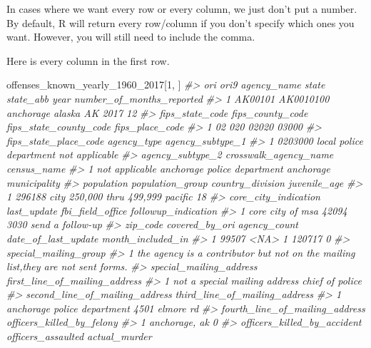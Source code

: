 \documentclass[
  12pt,
]{book}
\newenvironment{Shaded}{\begin{snugshade}}{\end{snugshade}}
\newcommand{\CommentTok}[1]{\textcolor[rgb]{0.37,0.37,0.37}{\textit{#1}}}
\newcommand{\DecValTok}[1]{\textcolor[rgb]{0.06,0.06,0.06}{#1}}
\newcommand{\NormalTok}[1]{#1}
\begin{document}
In cases where we want every row or every column, we just don't put a number. By default, R will return every row/column if you don't specify which ones you want. However, you will still need to include the comma.

Here is every column in the first row.

\begin{Shaded}
\begin{Highlighting}[]
\NormalTok{offenses\_known\_yearly\_}\DecValTok{1960}\NormalTok{\_}\DecValTok{2017}\NormalTok{[}\DecValTok{1}\NormalTok{, ]}
\CommentTok{\#>       ori      ori9 agency\_name  state state\_abb year number\_of\_months\_reported}
\CommentTok{\#> 1 AK00101 AK0010100   anchorage alaska        AK 2017                        12}
\CommentTok{\#>   fips\_state\_code fips\_county\_code fips\_state\_county\_code fips\_place\_code}
\CommentTok{\#> 1              02              020                  02020           03000}
\CommentTok{\#>   fips\_state\_place\_code             agency\_type agency\_subtype\_1}
\CommentTok{\#> 1               0203000 local police department   not applicable}
\CommentTok{\#>   agency\_subtype\_2       crosswalk\_agency\_name            census\_name}
\CommentTok{\#> 1   not applicable anchorage police department anchorage municipality}
\CommentTok{\#>   population          population\_group country\_division juvenile\_age}
\CommentTok{\#> 1     296188 city 250,000 thru 499,999          pacific           18}
\CommentTok{\#>   core\_city\_indication last\_update fbi\_field\_office followup\_indication}
\CommentTok{\#> 1     core city of msa       42094             3030    send a follow{-}up}
\CommentTok{\#>   zip\_code covered\_by\_ori agency\_count date\_of\_last\_update month\_included\_in}
\CommentTok{\#> 1    99507           <NA>            1              120717                 0}
\CommentTok{\#>                                                              special\_mailing\_group}
\CommentTok{\#> 1 the agency is a contributor but not on the mailing list,they are not sent forms.}
\CommentTok{\#>         special\_mailing\_address first\_line\_of\_mailing\_address}
\CommentTok{\#> 1 not a special mailing address               chief of police}
\CommentTok{\#>   second\_line\_of\_mailing\_address third\_line\_of\_mailing\_address}
\CommentTok{\#> 1    anchorage police department                4501 elmore rd}
\CommentTok{\#>   fourth\_line\_of\_mailing\_address officers\_killed\_by\_felony}
\CommentTok{\#> 1                  anchorage, ak                         0}
\CommentTok{\#>   officers\_killed\_by\_accident officers\_assaulted actual\_murder}

\end{Highlighting}
\end{Shaded}
\end{document}
